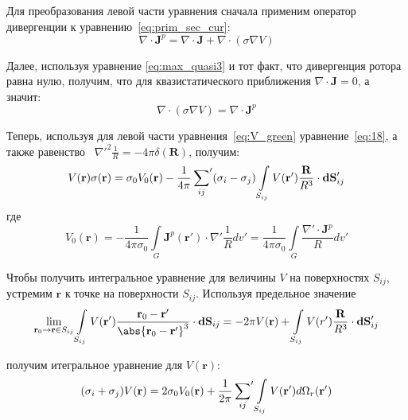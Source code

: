 Для преобразования левой части уравнения сначала применим оператор дивергенции
к уравнению~\ref{eq:prim_sec_cur}:
\begin{equation}
    \nabla \cdot \mathbf{J}^p = \nabla \cdot \mathbf{J} + \nabla \cdot(\sigma\nabla V)
\end{equation}

Далее, используя уравнение \ref{eq:max_quasi3} и тот факт, что дивергенция ротора равна нулю,
получим, что для квазистатического приближения $\nabla \cdot \mathbf{J} = 0$, а значит:
\begin{equation}
    \nabla\cdot(\sigma\nabla V) = \nabla \cdot \mathbf{J}^p
    \label{eq:18}
\end{equation}

Теперь, используя для левой части уравнения~\ref{eq:V_green} уравнение~\ref{eq:18}, а также равенство~
${\nabla'}^2\frac{1}{R} = {-4\pi\delta(\mathbf{R})}$, получим:
\begin{equation}
    V(\mathbf{r})\sigma(\mathbf{r}) = \sigma_0V_0(\mathbf{r}) -
    \frac{1}{4\pi}\sideset{}{'}\sum_{ij}(\sigma_i - \sigma_j)
    \int \limits_{S_{ij}}V(\mathbf{r}')\frac{\mathbf{R}}{R^3}\cdot \mathbf{dS}'_{ij}
\end{equation}
где
\begin{equation}
    V_0(\mathbf{r}) =
    {-\frac{1}{4\pi\sigma_0}\int\limits_{G}\mathbf{J}^p(\mathbf{r}')\cdot\nabla'\frac{1}{R}dv'} =
    \frac{1}{4\pi\sigma_0} \int\limits_{G}\frac{\nabla'\cdot \mathbf{J}^p}{R} dv'
\end{equation}

Чтобы получить интегральное уравнение для величины $V$ на поверхностях $S_{ij}$, устремим
$\mathbf{r}$ к точке на поверхности $S_{ij}$. Используя предельное значение \cite{vladimirov}
\begin{equation}
    \lim_{\mathbf{r}_0 \to \mathbf{r} \in S_{ij}}
    \int \limits_{S_{ij}} V(\mathbf{r}')
    \frac{\mathbf{r}_0-\mathbf{r}'}{\abs{\mathbf{r}_0 - \mathbf{r}'}^3} \cdot \mathbf{dS}_{ij}
        = {-2\pi V(\mathbf{r}) + \int \limits_{S_{ij}}V(r')\frac{\mathbf{R}}{R^3}\cdot \mathbf{dS}'_{ij}}
\end{equation}

получим итегральное уравнение для $V(\mathbf{r})$:
\begin{equation}
    (\sigma_i + \sigma_j) V(\mathbf{r}) = 2\sigma_0V_0(\mathbf{r}) + \frac{1}{2\pi} \sideset{}{'}\sum_{ij}
    \int \limits_{S_{ij}} V(\mathbf{r}')d\Omega_r(\mathbf{r}')
    \label{eq:V_surf}
\end{equation}

